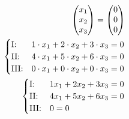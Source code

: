 \begin{align*}
\begin{pmatrix}
        x_1 \\ x_2 \\ x_3
    \end{pmatrix} = \begin{pmatrix}
        0 \\ 0 \\ 0
    \end{pmatrix}\\
    \begin{cases}
        \text{I:\@} & 1 \cdot x_1 + 2 \cdot x_2 + 3 \cdot x_3 = 0 \\
        \text{II:\@} & 4 \cdot x_1 + 5 \cdot x_2 + 6 \cdot x_3 = 0 \\
        \text{III:\@} & 0 \cdot x_1 + 0 \cdot x_2 + 0 \cdot x_3 = 0
    \end{cases} \\
    \begin{cases}
        \text{I:\@} & 1x_1 + 2x_2 + 3x_3 = 0 \\
        \text{II:\@} & 4x_1 + 5x_2 + 6x_3 = 0 \\
        \text{III:\@} & 0 = 0
    \end{cases}
\end{align*}

